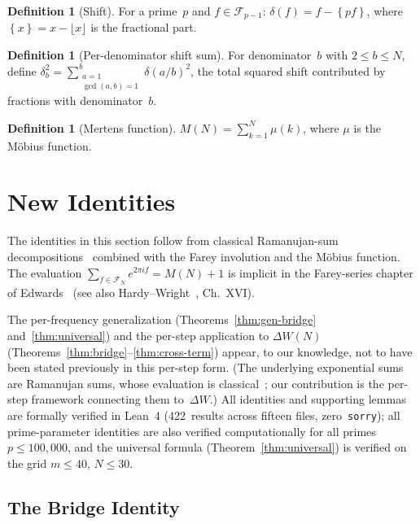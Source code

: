 \documentclass[11pt]{article}
\theoremstyle{definition}
\newtheorem{definition}[theorem]{Definition}
\newcommand{\F}{\mathcal{F}}
\newcommand{\fpart}[1]{\left\{#1\right\}}
\begin{document}
\begin{definition}[Shift]
For a prime~$p$ and $f \in \F_{p-1}$:
$\delta(f) = f - \fpart{pf}$,
where $\fpart{x} = x - \lfloor x \rfloor$ is the fractional part.
\end{definition}

\begin{definition}[Per-denominator shift sum]
For denominator~$b$ with $2 \le b \le N$, define
$\delta_b^2 = \sum_{\substack{a=1 \\ \gcd(a,b)=1}}^{b} \delta(a/b)^2$,
the total squared shift contributed by fractions with denominator~$b$.
\end{definition}

\begin{definition}[Mertens function]
$M(N) = \sum_{k=1}^{N} \mu(k)$,
where $\mu$ is the M\"obius function.
\end{definition}


\section{New Identities}\label{sec:identities}

The identities in this section follow from classical
Ramanujan-sum decompositions~\cite{Ramanujan1918, Kanemitsu1982}
combined with the Farey involution and the M\"obius function.
The evaluation $\sum_{f \in \F_N} e^{2\pi i f} = M(N)+1$ is
implicit in the Farey-series chapter of Edwards~\cite{Edwards1974}
(see also Hardy--Wright~\cite{HardyWright2008}, Ch.~XVI\@).

The per-frequency generalization (Theorems~\ref{thm:gen-bridge}
and~\ref{thm:universal}) and the per-step application to
$\Delta W(N)$ (Theorems~\ref{thm:bridge}--\ref{thm:cross-term})
appear, to our knowledge, not to have been stated previously
in this per-step form.  (The underlying exponential sums are
Ramanujan sums, whose evaluation is classical~\cite{Ramanujan1918};
our contribution is the per-step framework connecting them
to~$\Delta W$.)  All identities and supporting lemmas are
formally verified in Lean~4 (422~results across fifteen files,
zero~\texttt{sorry}); all prime-parameter identities
are also verified
computationally for all primes $p \le 100{,}000$, and the universal
formula (Theorem~\ref{thm:universal}) is verified on the grid
$m \le 40$, $N \le 30$.

\subsection{The Bridge Identity}
\end{document}
